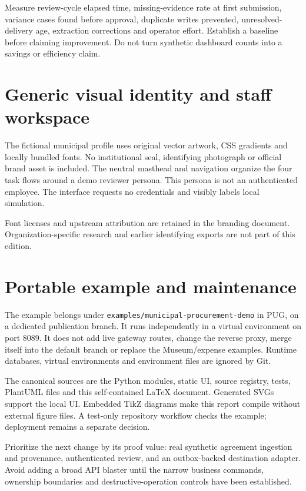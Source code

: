 \documentclass[11pt,letterpaper]{article}
\newcommand{\code}[1]{\texttt{\small #1}}
\begin{document}
Measure review-cycle elapsed time, missing-evidence rate at first submission, variance cases found before approval, duplicate writes prevented, unresolved-delivery age, extraction corrections and operator effort. Establish a baseline before claiming improvement. Do not turn synthetic dashboard counts into a savings or efficiency claim.

\section{Generic visual identity and staff workspace}
The fictional municipal profile uses original vector artwork, CSS gradients and locally bundled fonts. No institutional seal, identifying photograph or official brand asset is included. The neutral masthead and navigation organize the four task flows around a demo reviewer persona. This persona is not an authenticated employee. The interface requests no credentials and visibly labels local simulation.

Font licenses and upstream attribution are retained in the branding document. Organization-specific research and earlier identifying exports are not part of this edition.

\section{Portable example and maintenance}
The example belongs under \code{examples/municipal-procurement-demo} in PUG, on a dedicated publication branch. It runs independently in a virtual environment on port 8089. It does not add live gateway routes, change the reverse proxy, merge itself into the default branch or replace the Museum/expense examples. Runtime databases, virtual environments and environment files are ignored by Git.

The canonical sources are the Python modules, static UI, source registry, tests, PlantUML files and this self-contained LaTeX document. Generated SVGs support the local UI. Embedded TikZ diagrams make this report compile without external figure files. A test-only repository workflow checks the example; deployment remains a separate decision.

Prioritize the next change by its proof value: real synthetic agreement ingestion and provenance, authenticated review, and an outbox-backed destination adapter. Avoid adding a broad API blaster until the narrow business commands, ownership boundaries and destructive-operation controls have been established.
\end{document}
